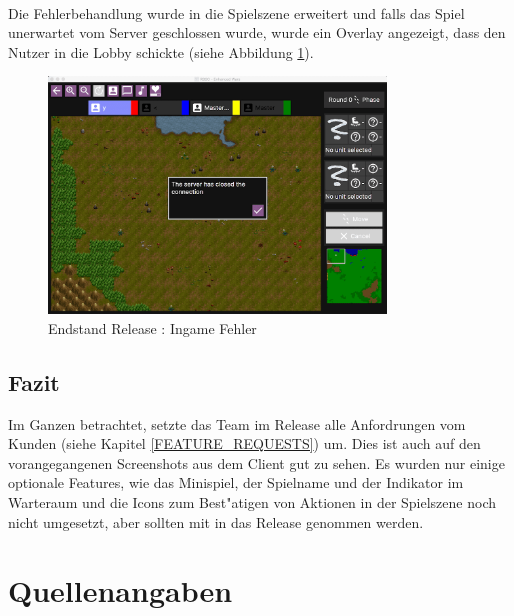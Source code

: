 \documentclass[12pt, titlepage]{scrartcl}
\newcommand{\RN}[1]{%
	\textup{\uppercase\expandafter{\romannumeral#1}}%
}
\begin{document}
					\ \\ Die Fehlerbehandlung wurde in die Spielszene erweitert und falls das Spiel unerwartet vom Server geschlossen wurde, wurde ein Overlay angezeigt, dass den Nutzer in die Lobby schickte (siehe Abbildung \ref{End_Failure}).
					\begin{figure}[H] 
						\centering
						\includegraphics[width=0.8\textwidth]{images/endOfRelease/Failure.png}
						\caption{Endstand Release \RN{3}: Ingame Fehler}
						\label{End_Failure}
					\end{figure}
		\subsection{Fazit}
			Im Ganzen betrachtet, setzte das Team im Release \RN{3} alle Anfordrungen vom Kunden (siehe Kapitel \ref{FEATURE_REQUESTS}) um. Dies ist auch auf den vorangegangenen Screenshots aus dem Client gut zu sehen. Es wurden nur einige optionale Features, wie das Minispiel, der Spielname und der Indikator im Warteraum und die Icons zum Best"atigen von Aktionen in der Spielszene noch nicht umgesetzt, aber sollten mit in das Release \RN{4} genommen werden.
	\newpage
	\section{Quellenangaben}
		\listoffigures
		\listoftables
\end{document}
